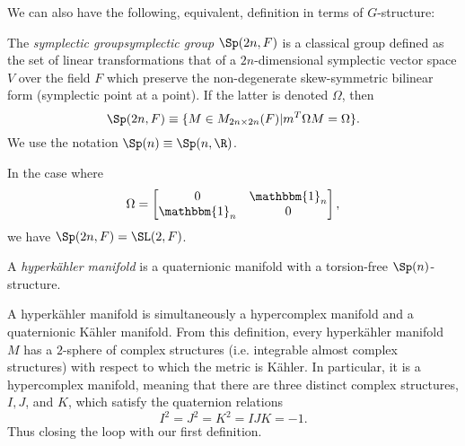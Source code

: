 \documentclass{worksheetclass}
\begin{document}
        We can also have the following, equivalent, definition in terms of $G$-structure:
        \begin{defn}
            The \emph{symplectic group}\emph{symplectic group} $\Sp(2n,F)$\index{$\Sp$} is a classical group defined as the set of linear transformations that of a $2n$-dimensional symplectic vector space $V$ over the field $F$ which preserve the non-degenerate skew-symmetric bilinear form (symplectic point at a point). If the latter is denoted $\Omega$, then
            \begin{equation*}
                \Sp(2n,F)\equiv\{M\in M_{2n\times2n}(F)|m^T\Omega M=\Omega\}.
            \end{equation*}
            We use the notation $\Sp(n)\equiv\Sp(n,\R)$.
        \end{defn}
        In the case where
        \begin{equation}
            \Omega=
            \begin{bmatrix}
                0 & \mathbbm{1}_n \\
                \mathbbm{1}_n & 0
            \end{bmatrix},
        \end{equation}
        we have $\Sp(2n,F)=\SL(2,F)$.
        \begin{defn}
            A \emph{hyperkähler manifold} is a quaternionic manifold with a torsion-free $\Sp(n)$-structure. 
        \end{defn}
        A hyperkähler manifold is simultaneously a hypercomplex manifold and a quaternionic Kähler manifold. From this definition, every hyperkähler manifold $M$ has a $2$-sphere of complex structures (i.e. integrable almost complex structures) with respect to which the metric is Kähler. In particular, it is a hypercomplex manifold, meaning that there are three distinct complex structures, $I, J$, and $K$, which satisfy the quaternion relations
        \begin{equation}
            I^2=J^2=K^2=IJK=-1.
        \end{equation}
        Thus closing the loop with our first definition.
\end{document}
